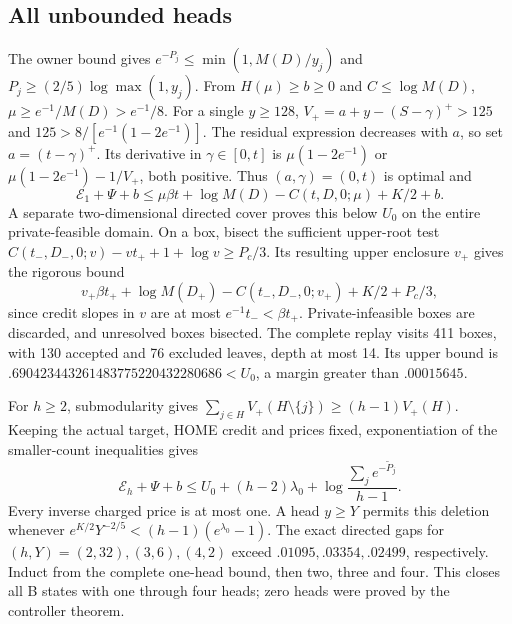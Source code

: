 \subsection{All unbounded heads}

The owner bound gives $e^{-P_j}\le\min(1,M(D)/y_j)$ and
$P_j\ge(2/5)\log\max(1,y_j)$. From $H(\mu)\ge b\ge0$ and
$C\le\log M(D)$, $\mu\ge e^{-1}/M(D)>e^{-1}/8$.
For a single $y\ge128$, $V_+=a+y-(S-\gamma)^+>125$ and
$125>8/[e^{-1}(1-2e^{-1})]$. The residual expression decreases with $a$,
so set $a=(t-\gamma)^+$. Its derivative in $\gamma\in[0,t]$ is
$\mu(1-2e^{-1})$ or $\mu(1-2e^{-1})-1/V_+$, both positive.
Thus $(a,\gamma)=(0,t)$ is optimal and
\begin{equation}\label{simp:tail-gate}
 \mathcal E_1+\Psi+b
 \le\mu\beta t+\log M(D)-C(t,D,0;\mu)+K/2+b.
\end{equation}
A separate two-dimensional directed cover proves this below $U_0$ on
the entire private-feasible domain. On a box, bisect the sufficient
upper-root test $C(t_-,D_-,0;v)-vt_++1+\log v\ge P_c/3$.
Its resulting upper enclosure $v_+$ gives the rigorous bound
\[
 v_+\beta t_++\log M(D_+)-C(t_-,D_-,0;v_+)+K/2+P_c/3,
\]
since credit slopes in $v$ are at most $e^{-1}t_-<\beta t_+$.
Private-infeasible boxes are discarded, and unresolved boxes bisected.
The complete replay visits 411 boxes, with 130 accepted and 76 excluded
leaves, depth at most 14. Its upper bound is
$.690423443261483775220432280686<U_0$, a margin greater than $.00015645$.

For $h\ge2$, submodularity gives
$\sum_{j\in H}V_+(H\setminus\{j\})\ge(h-1)V_+(H)$.
Keeping the actual target, HOME credit and prices fixed, exponentiation
of the smaller-count inequalities gives
\[
 \mathcal E_h+\Psi+b\le U_0+(h-2)\lambda_0+
               \log\frac{\sum_j e^{-\widetilde P_j}}{h-1}.
\]
Every inverse charged price is at most one. A head $y\ge Y$ permits
this deletion whenever
$e^{K/2}Y^{-2/5}<(h-1)(e^{\lambda_0}-1)$.
The exact directed gaps for $(h,Y)=(2,32),(3,6),(4,2)$ exceed
$.01095,.03354,.02499$, respectively. Induct from the complete one-head
bound, then two, three and four. This closes all B states with one
through four heads; zero heads were proved by the controller theorem.
